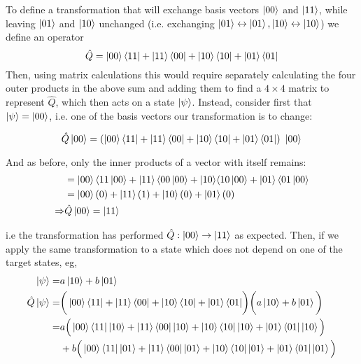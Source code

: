 \begin{example}
    To define a transformation that will exchange basis vectors $\ket{00}$ and $\ket{11}$, 
        while leaving $\ket{01}$ and $\ket{10}$ unchanged (i.e. exchanging $\ket{01} \leftrightarrow \ket{01}, \ket{10} \leftrightarrow \ket{10} $) 
        we define an operator
    \begin{equation}
        \hat{Q} = \ket{00} \bra{11} + \ket{11} \bra{00} + |10 \rangle \bra{10} + \ket{01} \langle 01| 
    \end{equation}
    Then, using matrix calculations this would require separately calculating the four outer products in the above sum and adding them to find a $4\times4$ matrix to represent $\hat{Q}$, 
        which then acts on a state $\ket{\psi}$. 
    Instead, consider first that $\ket{\psi} = \ket{00}$, i.e. one of the basis vectors our transformation is to change:

    \begin{equation}
        \hat{Q}\ket{00} = \left(\ket{00} \bra{11} + \ket{11} \bra{00} + |10 \rangle \bra{10} + \ket{01} \langle 01|\right) \ \ket{00} 
    \end{equation}

    And as before, only the inner products of a vector with itself remains:
    \begin{equation}
        \begin{split}
            &= \ket{00} \langle 11 \ket{00} + \ket{11} \langle 00 \ket{00} + |10 \rangle \langle 10 \ket{00} + \ket{01} \langle 01\ket{00} 
            \\ &= \ket{00} (0) + \ket{11} (1) + \ket{10} (0) + \ket{01} (0)
            \\ \Rightarrow & \hat{Q}\ket{00} = \ket{11} 
        \end{split}
    \end{equation}

    i.e the transformation has performed $\hat{Q}: \ket{00} \rightarrow \ket{11}$ as expected. 
    Then, if we apply the same transformation to a state which does not depend on one of the target states, eg,  
    \begin{equation}
        \begin{split}
            \ket{\psi} = & a \ket{10} + b \ket{01} 
            \\ \hat{Q}\ket{\psi} = & \bigg( \ket{00} \bra{11} + \ket{11} \bra{00} + |10 \rangle \bra{10} + \ket{01} \langle 01| \bigg) \bigg( a \ket{10} + b \ket{01} \bigg)
            \\ = &a \Big( \ket{00} \bra{11} \ket{10} + \ket{11} \bra{00}\ket{10} + |10 \rangle \bra{10}\ket{10} + \ket{01} \langle 01| \ket{10} \Big) 
            \\   &+ b \Big(\ket{00} \bra{11}\ket{01} + \ket{11} \langle 00|\ket{01} + |10 \rangle \bra{10}\ket{01} + \ket{01} \langle 01|\ket{01}\Big) 
        \end{split}
    \end{equation}


\end{example}
